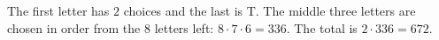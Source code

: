 The first letter has $2$ choices and the last is T. The middle three letters are chosen in order from the $8$ letters left: $8\cdot7\cdot6=336$. The total is $2\cdot336=\boxed{672}$.
